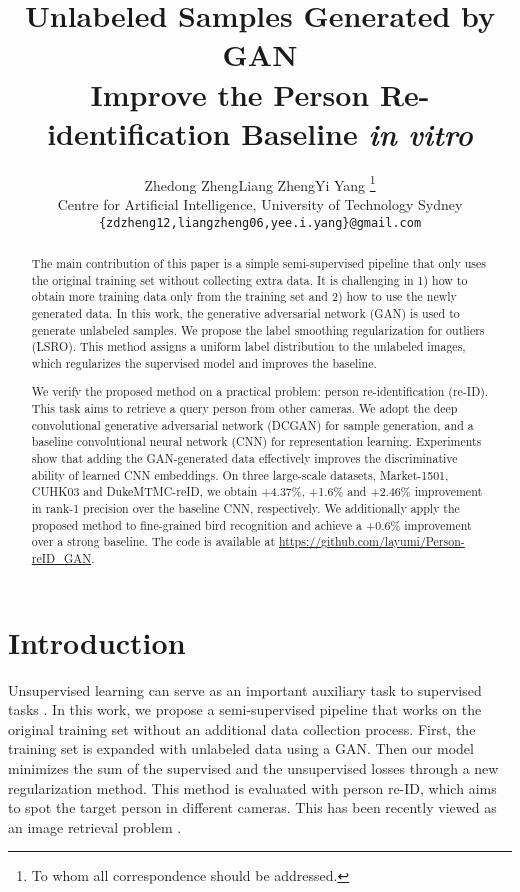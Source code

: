 \documentclass[10pt,twocolumn,letterpaper]{article}
\begin{document}
\title{Unlabeled Samples Generated by GAN \\ Improve the Person Re-identification Baseline \emph{in vitro}}

\author{Zhedong Zheng\qquad Liang Zheng\qquad Yi Yang \thanks{To whom all correspondence should be addressed.} \\
Centre for Artificial Intelligence, University of Technology Sydney\\ 
{\tt\small \{zdzheng12,liangzheng06,yee.i.yang\}@gmail.com}
}

\maketitle
\thispagestyle{empty}


\begin{abstract}
The main contribution of this paper is a simple semi-supervised pipeline that only uses the original training set without collecting extra data. It is challenging in 1) how to obtain more training data only from the training set and 2) how to use the newly generated data. In this work, the generative adversarial network (GAN) is used to generate unlabeled samples. We propose the label smoothing regularization for outliers (LSRO). This method assigns a uniform label distribution to the unlabeled images, which regularizes the supervised model and improves the baseline.

We verify the proposed method on a practical problem: person re-identification (re-ID). This task aims to retrieve a query person from other cameras. We adopt the deep convolutional generative adversarial network (DCGAN) for sample generation, and a baseline convolutional neural network (CNN) for representation learning. Experiments show that adding the GAN-generated data effectively improves the discriminative ability of learned CNN embeddings. On three large-scale datasets, Market-1501, CUHK03 and DukeMTMC-reID, we obtain +4.37\%, +1.6\% and +2.46\% improvement in rank-1 precision over the baseline CNN, respectively. We additionally apply the proposed method to fine-grained bird recognition and achieve a +0.6\% improvement over a strong baseline. The code is available at \url{https://github.com/layumi/Person-reID_GAN}.
\end{abstract}

\section{Introduction}
Unsupervised learning can serve as an important auxiliary task to supervised tasks \cite{hinton2006reducing,rasmus2015semi,goodfellow2013multi,ranzato2008semi}. In this work, we propose a semi-supervised pipeline that works on the original training set without an additional data collection process. First, the training set is expanded with unlabeled data using a GAN. Then our model minimizes the sum of the supervised and the unsupervised losses through a new regularization method. This method is evaluated with person re-ID, which aims to spot the target person in different cameras. This has been recently viewed as an image retrieval problem \cite{zheng2016survey}. 
\end{document}
